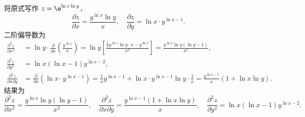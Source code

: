 \begin{solution}
    将原式写作 $z = \e^{\ln x \ln y}$．
    \begin{equation}
        \frac{\partial z}{\partial x} = \frac{y^{\ln x} \ln y}{x}, \quad \frac{\partial z}{\partial y} = \ln x \cdot y^{\ln x - 1}.
    \end{equation}
    二阶偏导数为
    \begin{equation}
        \begin{aligned}
            \frac{\partial^{2} z}{\partial x^{2}}        & = \ln y \cdot \frac{\partial}{\partial x} \left( \frac{y^{\ln x}}{x} \right) = \ln y \left[ \frac{\frac{1}{x} y^{\ln x} \ln y \cdot x - y^{\ln x}}{x^{2}} \right] = \frac{y^{\ln x} \ln y (\ln y - 1)}{x^{2}}, \\
            \frac{\partial^{2} z}{\partial y^{2}}        & = \ln x (\ln x - 1) y^{\ln x - 2},                                                                                                                                                                             \\
            \frac{\partial^{2} z}{\partial x \partial y} & = \frac{\partial}{\partial x} (\ln x \cdot y^{\ln x - 1}) = \frac{1}{x} y^{\ln x - 1} + \ln x \cdot y^{\ln x - 1} \ln y \cdot \frac{1}{x} = \frac{y^{\ln x - 1}}{x} (1 + \ln x \ln y).
        \end{aligned}
    \end{equation}
    结果为
    \begin{equation}
        \boxed{\frac{\partial^{2} z}{\partial x^{2}} = \frac{y^{\ln x} \ln y (\ln y - 1)}{x^{2}}, \quad \frac{\partial^{2} z}{\partial x \partial y} = \frac{y^{\ln x - 1}(1 + \ln x \ln y)}{x}, \quad \frac{\partial^{2} z}{\partial y^{2}} = \ln x (\ln x - 1) y^{\ln x - 2}.}
    \end{equation}


\end{solution}
